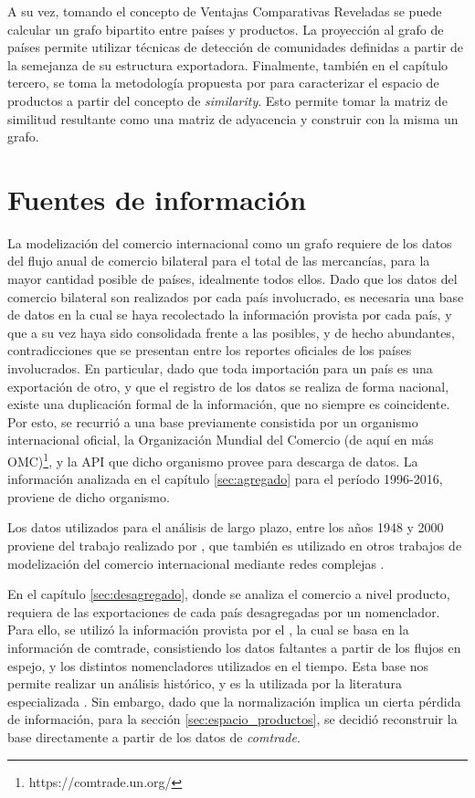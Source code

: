 \documentclass[class=article, crop=false]{standalone}
\begin{document}
A su vez, tomando el concepto de Ventajas Comparativas Reveladas \citep{balassa1965trade} se puede calcular un grafo bipartito entre países y productos. La proyección al grafo de países permite utilizar técnicas de detección de comunidades definidas a partir de la semejanza de su estructura exportadora. Finalmente, también en el capítulo tercero, se toma la metodología propuesta por \cite{Hidalgo2009} para caracterizar el espacio de productos a partir del concepto de \textit{similarity}. Esto permite tomar la matriz de similitud resultante como una matriz de adyacencia y construir con la misma un grafo. 



\section{Fuentes de información}


La modelización del comercio internacional como un grafo requiere de los datos del flujo anual de comercio bilateral para el total de las mercancías, para la mayor cantidad posible de países, idealmente todos ellos. Dado que los datos del comercio bilateral son realizados por cada país involucrado, es necesaria una base de datos en la cual se haya recolectado la información provista por cada país, y que a su vez haya sido consolidada frente a las posibles, y de hecho abundantes, contradicciones que se presentan entre los reportes oficiales de los países involucrados. En particular, dado que toda importación para un país es una exportación de otro, y que el registro de los datos se realiza de forma nacional, existe una duplicación formal de la información, que no siempre es coincidente. Por esto, se recurrió a una base previamente consistida por un organismo internacional oficial, la Organización Mundial del Comercio (de aquí en más OMC)\footnote{https://comtrade.un.org/}, y la API que dicho organismo provee para descarga de datos. La información analizada  en el capítulo \ref{sec:agregado} para el período 1996-2016, proviene de dicho organismo.

Los datos utilizados para el análisis de largo plazo, entre los años 1948 y 2000 proviene del trabajo realizado por \cite{Gleditsch2002}, que también es utilizado en otros trabajos de modelización del comercio internacional mediante redes complejas \cite{Fagiolo2010}.

En el capítulo \ref{sec:desagregado}, donde se analiza el comercio a nivel producto, requiera de las exportaciones de cada país desagregadas por un nomenclador. Para ello, se utilizó la información provista por el \textit{\cite{star}}, la cual se basa en la información de comtrade, consistiendo los datos faltantes a partir de los flujos en espejo, y los distintos nomencladores utilizados en el tiempo. Esta base nos permite realizar un análisis histórico, y es la utilizada por la literatura especializada \citep{Hidalgo2007, Hidalgo2009, Hidalgo2009a}. Sin embargo, dado que la normalización implica un cierta pérdida de información, para la sección \ref{sec:espacio_productos}, se decidió reconstruir la base directamente a partir de los datos de \textit{comtrade}.
\end{document}
